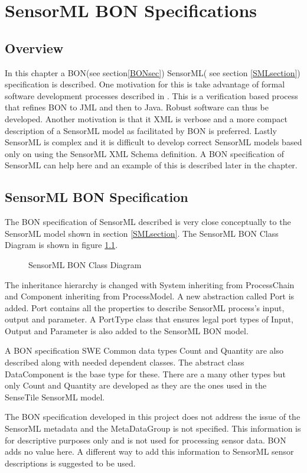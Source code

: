 \documentclass[]{final_report}
\begin{document}
\chapter{SensorML BON Specifications}
\section{Overview}
In this chapter a BON(see section\ref{BONsec}) SensorML( see section \ref{SMLsection}) specification is described. One motivation for this is take advantage of formal software development processes described in \cite{Kiniryref}. This is a verification based process that refines BON to JML and then to Java. Robust software can thus be developed. Another motivation is that it XML is verbose and a more compact description of a SensorML model as facilitated by BON is preferred. Lastly SensorML is complex and it is difficult to develop correct SensorML models based only on using the SensorML XML Schema definition. A BON specification of SensorML can help here and an example of this is described later in the chapter.

\section{SensorML BON Specification}
The BON specification of SensorML described is very close conceptually to the SensorML model shown in section \ref{SMLsection}.  The SensorML BON Class Diagram is shown in figure \ref{fig:bonSensoMLModel}. 
\begin{figure}[h]
\centering
{}
\caption{SensorML BON Class Diagram}\label{fig:bonSensoMLModel}
\end{figure}
\newline
The inheritance hierarchy is changed with System inheriting from ProcessChain and Component inheriting from ProcessModel. A new abstraction called Port is added. Port contains all the properties to describe SensorML process's input, output and parameter. A PortType class that ensures legal port types of Input, Output and Parameter is also added to the SensorML BON model.

A BON specification SWE Common data types Count and Quantity are also described along with needed dependent classes. The abstract class DataComponent is the base type for these. There are a many other types but only Count and Quantity are developed as they are the ones used in the SenseTile SensorML model.

The BON specification developed in this project does not address the issue of the SensorML metadata and the MetaDataGroup is not specified. This information is for descriptive purposes only and is not used for processing sensor data. BON adds no value here. A different way to add this information to SensorML sensor descriptions is suggested to be used.
\end{document}
